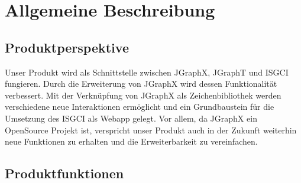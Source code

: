 \documentclass[11pt,a4paper]{article}
\begin{document}
\newpage
\section{Allgemeine Beschreibung} %
  	\subsection{Produktperspektive} %
	Unser Produkt wird als Schnittstelle zwischen JGraphX, JGraphT und ISGCI fungieren. Durch die Erweiterung von JGraphX wird dessen Funktionalität verbessert. Mit der Verknüpfung von JGraphX als Zeichenbibliothek werden verschiedene neue Interaktionen ermöglicht und ein Grundbaustein für die Umsetzung des ISGCI als Webapp gelegt. Vor allem, da JGraphX ein OpenSource Projekt ist, verspricht unser Produkt auch in der Zukunft weiterhin neue Funktionen zu erhalten und die Erweiterbarkeit zu vereinfachen.
  	\subsection{Produktfunktionen} %
  	
\end{document}
